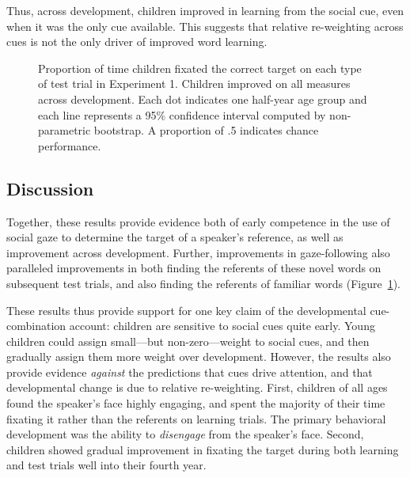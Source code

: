 \documentclass[man,floatsintext]{apa6}
\begin{document}
Thus, across development, children improved in learning from the social cue, even when it was the only cue available. This suggests that relative re-weighting across cues is not the only driver of improved word learning.

\begin{figure}[tb]
	\caption{\label{fig:exp1_train_test} Proportion of time children fixated the correct target on each type of test trial in Experiment 1. Children improved on all measures across development. Each dot indicates one half-year age group and each line represents a 95\% confidence interval computed by non-parametric bootstrap. A proportion of .5 indicates chance performance.}
\end{figure}	

\subsection{Discussion}

Together, these results provide evidence both of early competence in the use of social gaze to determine the target of a speaker's reference, as well as improvement across development. Further, improvements in gaze-following also paralleled improvements in both finding the referents of these novel words on subsequent test trials, and also finding the referents of familiar words (Figure~\ref{fig:exp1_train_test}).

These results thus provide support for one key claim of the developmental cue-combination account: children are sensitive to social cues quite early. Young children could assign small---but non-zero---weight to social cues, and then gradually assign them more weight over development. However, the results also provide evidence \emph{against} the predictions that cues drive attention, and that developmental change is due to relative re-weighting. First, children of all ages found the speaker's face highly engaging, and spent the majority of their time fixating it rather than the referents on learning trials. The primary behavioral development was the ability to {\it disengage} from the speaker's face. Second, children showed gradual improvement in fixating the target during both learning and test trials well into their fourth year.
\end{document}
